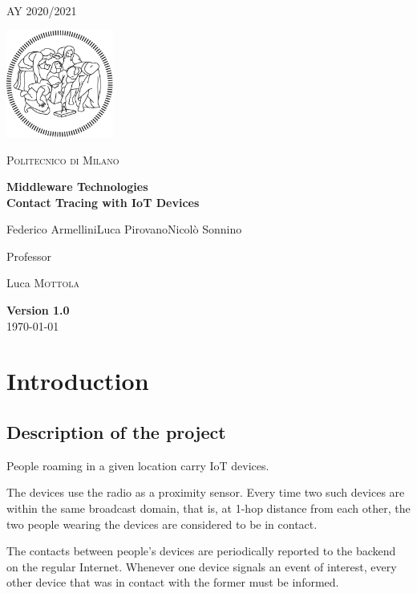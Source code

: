 \documentclass[table, 12pt]{article}
\begin{document}
\begin{titlepage}
    \centering
    {\scshape\large AY 2020/2021 \par}
    \vfill
    \includegraphics[width=100pt]{assets/logo-polimi-new}\par\vspace{1cm}
    {\scshape\LARGE Politecnico di Milano \par}
    \vspace{1.5cm}
    {\huge\bfseries Middleware Technologies\\Contact Tracing with IoT Devices\par}
    \vspace{2cm}
    {\Large {Federico Armellini\quad Luca Pirovano\quad Nicolò Sonnino}\par}
    \vfill
    {\large Professor\par
        Luca \textsc{Mottola}}
    \vfill
    {\large \textbf{Version 1.0}\\ \today \par}
\end{titlepage}
\thispagestyle{plain}
\mbox{}
\newpage
{}
\tableofcontents
\newpage
{}
\section{Introduction}
\subsection{Description of the project}
People roaming in a given location carry IoT devices.

The devices use the radio as a proximity sensor. Every time
two such devices are within the same broadcast domain, that is, at 1-hop distance from each other, the two
people wearing the devices are considered to be in contact. 

The contacts between people’s devices are
periodically reported to the backend on the regular Internet. Whenever one device signals an event of interest,
every other device that was in contact with the former must be informed.
\end{document}
